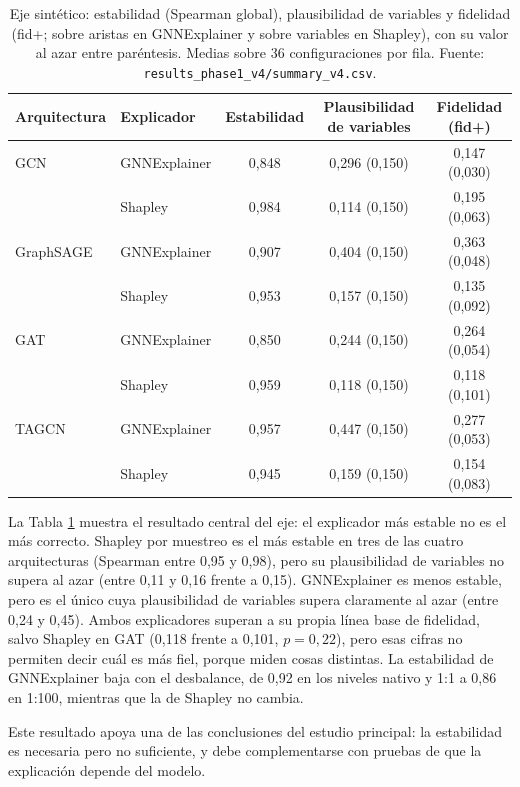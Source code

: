 \begin{table}[ht]
\centering
\caption{Eje sintético: estabilidad (Spearman global), plausibilidad de variables y fidelidad
(fid+; sobre aristas en GNNExplainer y sobre variables en Shapley), con su valor al azar entre
paréntesis. Medias sobre 36 configuraciones por fila.
Fuente: \texttt{results\_phase1\_v4/summary\_v4.csv}.}
\label{tab:sintetico}
\small
\begin{tabular}{llccc}
\toprule
Arquitectura & Explicador & Estabilidad & Plausibilidad de variables & Fidelidad (fid+) \\
\midrule
GCN & GNNExplainer & 0,848 & 0,296 (0,150) & 0,147 (0,030) \\
    & Shapley      & 0,984 & 0,114 (0,150) & 0,195 (0,063) \\
GraphSAGE & GNNExplainer & 0,907 & 0,404 (0,150) & 0,363 (0,048) \\
          & Shapley      & 0,953 & 0,157 (0,150) & 0,135 (0,092) \\
GAT & GNNExplainer & 0,850 & 0,244 (0,150) & 0,264 (0,054) \\
    & Shapley      & 0,959 & 0,118 (0,150) & 0,118 (0,101) \\
TAGCN & GNNExplainer & 0,957 & 0,447 (0,150) & 0,277 (0,053) \\
      & Shapley      & 0,945 & 0,159 (0,150) & 0,154 (0,083) \\
\bottomrule
\end{tabular}
\end{table}

La Tabla \ref{tab:sintetico} muestra el resultado central del eje: el explicador más estable
no es el más correcto. Shapley por muestreo es el más estable en tres de las cuatro
arquitecturas (Spearman entre 0,95 y 0,98), pero su plausibilidad de variables no supera al
azar (entre 0,11 y 0,16 frente a 0,15). GNNExplainer es menos estable, pero es el único cuya
plausibilidad de variables supera claramente al azar (entre 0,24 y 0,45). Ambos explicadores
superan a su propia línea base de fidelidad, salvo Shapley en GAT (0,118 frente a 0,101,
$p = 0{,}22$), pero esas cifras no
permiten decir cuál es más fiel, porque miden cosas distintas. La estabilidad de GNNExplainer baja con el desbalance, de 0,92 en los niveles
nativo y 1:1 a 0,86 en 1:100, mientras que la de Shapley no cambia.

Este resultado apoya una de las conclusiones del estudio principal: la estabilidad es
necesaria pero no suficiente, y debe complementarse con pruebas de que la explicación depende
del modelo.

